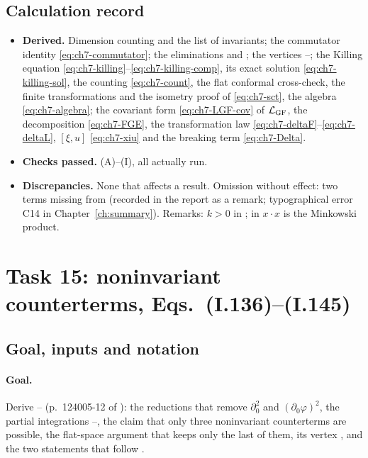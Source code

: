 \subsection{Calculation record}
\begin{itemize}[leftmargin=14pt]
\item \textbf{Derived.} Dimension counting and the list of invariants; the commutator identity \eqref{eq:ch7-commutator}; the eliminations and ; the vertices --;
the Killing equation \eqref{eq:ch7-killing}--\eqref{eq:ch7-killing-comp}, its exact solution \eqref{eq:ch7-killing-sol}, the counting \eqref{eq:ch7-count}, the flat conformal cross-check, the finite transformations and the isometry proof of  \eqref{eq:ch7-sct}, the algebra \eqref{eq:ch7-algebra};
the covariant form \eqref{eq:ch7-LGF-cov} of $\mathcal{L}_{\mathrm{GF}}$, the decomposition \eqref{eq:ch7-FGE}, the transformation law \eqref{eq:ch7-deltaF}--\eqref{eq:ch7-deltaL}, $[\xi,u]$ \eqref{eq:ch7-xiu} and the breaking term \eqref{eq:ch7-Delta}.
\item \textbf{Checks passed.} (A)--(I), all actually run.
\item \textbf{Discrepancies.} None that affects a result.
Omission without effect: two terms missing from  (recorded in the report as a remark; typographical error C14 in Chapter~\ref{ch:summary}).
Remarks: $k>0$ in ; in  $x\cdot x$ is the Minkowski product.
\end{itemize}

\section{Task 15: noninvariant counterterms, Eqs.~(I.136)--(I.145)}
\label{sec:ch7-task15}

\subsection{Goal, inputs and notation}

\paragraph{Goal.}
Derive -- (p.~124005-12 of \PI): the reductions that remove $\partial_0^2$ and $(\partial_0\varphi)^2$,
the partial integrations --, the claim that only three noninvariant counterterms  are possible, the flat-space argument that keeps only the last of them, its vertex , and the two statements that follow .


